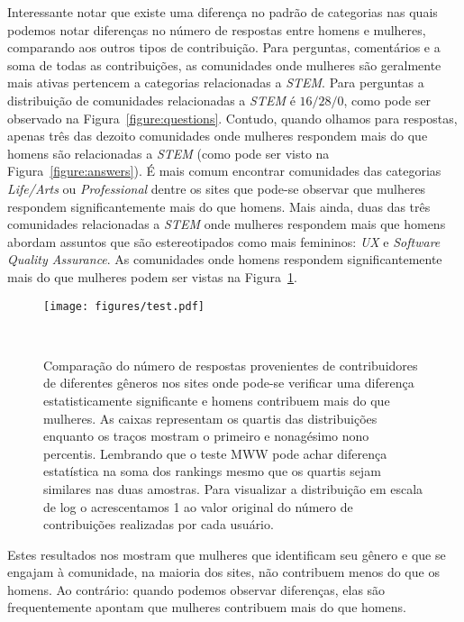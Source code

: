 Interessante notar que existe uma diferença no padrão de categorias nas quais podemos notar diferenças no número de respostas entre homens e mulheres, comparando aos outros tipos de contribuição. Para perguntas, comentários e a soma de todas as contribuições, as comunidades onde mulheres são geralmente mais ativas pertencem a categorias relacionadas a \emph{STEM}. Para perguntas a distribuição de comunidades relacionadas a \emph{STEM} é $16/28/0$, como pode ser observado na Figura~\ref{figure:questions}. Contudo, quando olhamos para respostas, apenas três das dezoito comunidades onde mulheres respondem mais do que homens são relacionadas a \emph{STEM} (como pode ser visto na Figura~\ref{figure:answers}). É mais comum encontrar comunidades das categorias \emph{Life/Arts} ou \emph{Professional} dentre os sites que pode-se observar que mulheres respondem significantemente mais do que homens. Mais ainda, duas das três comunidades relacionadas a \emph{STEM} onde mulheres respondem mais que homens abordam assuntos que são estereotipados como mais femininos: \emph{UX} e \textit{Software Quality Assurance}. As comunidades onde homens respondem significantemente mais do que mulheres podem ser vistas na Figura~\ref{figure:answers-men}.

\begin{figure}
  \raggedleft
  \texttt{[image: figures/test.pdf]}
  \caption[Comparação do número de respostas em comunidades onde homens respondem mais.]{Comparação do número de respostas provenientes de contribuidores de diferentes gêneros nos sites onde pode-se verificar uma diferença estatisticamente significante e homens contribuem mais do que mulheres. As caixas representam os quartis das distribuições enquanto os traços mostram o primeiro e nonagésimo nono percentis. Lembrando que o teste MWW pode achar diferença estatística na soma dos rankings mesmo que os quartis sejam similares nas duas amostras. Para visualizar a distribuição em escala de log o acrescentamos 1 ao valor original do número de contribuições realizadas por cada usuário. }~\label{figure:answers-men}
\end{figure}


Estes resultados nos mostram que mulheres que identificam seu gênero e que se engajam à comunidade, na maioria dos sites, não contribuem menos do que os homens. Ao contrário: quando podemos observar diferenças, elas são frequentemente apontam que mulheres contribuem mais do que homens.

